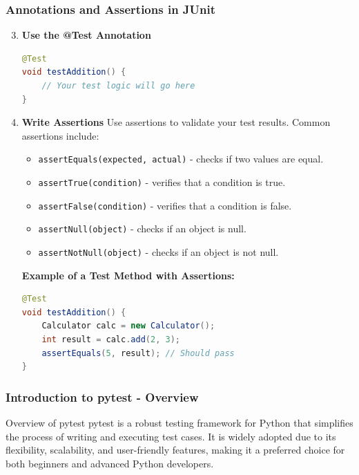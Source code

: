 \documentclass{beamer}
\begin{document}
\begin{frame}[fragile]
    \frametitle{Annotations and Assertions in JUnit}
    \begin{enumerate}
        \setcounter{enumi}{2}
        \item \textbf{Use the @Test Annotation}
        \begin{lstlisting}[language=Java]
@Test
void testAddition() {
    // Your test logic will go here
}
        \end{lstlisting}

        \item \textbf{Write Assertions}
        Use assertions to validate your test results. Common assertions include:
        \begin{itemize}
            \item \texttt{assertEquals(expected, actual)} - checks if two values are equal.
            \item \texttt{assertTrue(condition)} - verifies that a condition is true.
            \item \texttt{assertFalse(condition)} - verifies that a condition is false.
            \item \texttt{assertNull(object)} - checks if an object is null.
            \item \texttt{assertNotNull(object)} - checks if an object is not null.
        \end{itemize}

        \textbf{Example of a Test Method with Assertions:}
        \begin{lstlisting}[language=Java]
@Test
void testAddition() {
    Calculator calc = new Calculator();
    int result = calc.add(2, 3);
    assertEquals(5, result); // Should pass
}
        \end{lstlisting}
    \end{enumerate}
\end{frame}

\begin{frame}[fragile]
    \frametitle{Introduction to pytest - Overview}
    \begin{block}{Overview of pytest}
        pytest is a robust testing framework for Python that simplifies the process of writing and executing test cases. 
        It is widely adopted due to its flexibility, scalability, and user-friendly features, making it a preferred choice for both beginners and advanced Python developers.
    \end{block}
\end{frame}
\end{document}
